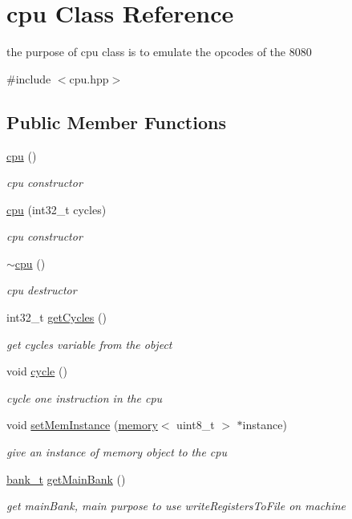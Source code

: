\hypertarget{classcpu}{}\section{cpu Class Reference}
\label{classcpu}


the purpose of cpu class is to emulate the opcodes of the 8080  




{\ttfamily \#include $<$cpu.\+hpp$>$}

\subsection*{Public Member Functions}
\begin{DoxyCompactItemize}
\item 
\hyperlink{classcpu_a22c701a37704bc8f4e255e6d3e336346}{cpu} ()
\begin{DoxyCompactList}\small\item\em cpu constructor \end{DoxyCompactList}\item 
\hyperlink{classcpu_ac872bcc84e0263dc6367691f75387580}{cpu} (int32\+\_\+t cycles)
\begin{DoxyCompactList}\small\item\em cpu constructor \end{DoxyCompactList}\item 
\hyperlink{classcpu_ac86c29fa51a1845f17080b27308ee80d}{$\sim$cpu} ()
\begin{DoxyCompactList}\small\item\em cpu destructor \end{DoxyCompactList}\item 
int32\+\_\+t \hyperlink{classcpu_a682eae4bdd78dd195444d88d71104d45}{get\+Cycles} ()
\begin{DoxyCompactList}\small\item\em get cycles variable from the object \end{DoxyCompactList}\item 
void \hyperlink{classcpu_a83c8f2610d7309fe67b84f9c1335bdf3}{cycle} ()
\begin{DoxyCompactList}\small\item\em cycle one instruction in the cpu \end{DoxyCompactList}\item 
void \hyperlink{classcpu_ac5f2ce2e48d25be7d4a7a32259b26241}{set\+Mem\+Instance} (\hyperlink{classmemory}{memory}$<$ uint8\+\_\+t $>$ $\ast$instance)
\begin{DoxyCompactList}\small\item\em give an instance of memory object to the cpu \end{DoxyCompactList}\item 
\hyperlink{structbank__t}{bank\+\_\+t} \hyperlink{classcpu_a7f3f1db27b1d64462874595fa246db4c}{get\+Main\+Bank} ()
\begin{DoxyCompactList}\small\item\em get main\+Bank, main purpose to use write\+Registers\+To\+File on machine \end{DoxyCompactList}\end{DoxyCompactItemize}


